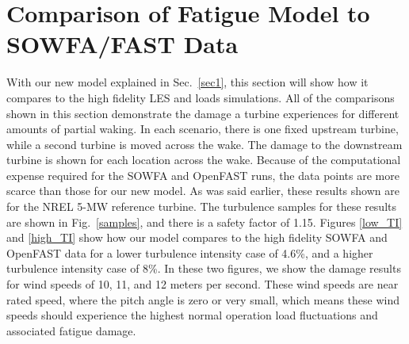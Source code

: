 \documentclass[11pt,letterpaper]{article}
\begin{document}
\section{Comparison of Fatigue Model to SOWFA/FAST Data}
With our new model explained in Sec.~\ref{sec1}, this section will show how it compares to the high fidelity LES and loads simulations. All of the comparisons shown in this section demonstrate the damage a turbine experiences for different amounts of partial waking. In each scenario, there is one fixed upstream turbine, while a second turbine is moved across the wake. The damage to the downstream turbine is shown for each location across the wake. Because of the computational expense required for the SOWFA and OpenFAST runs, the data points are more scarce than those for our new model. As was said earlier, these results shown are for the NREL 5-MW reference turbine. The turbulence samples for these results are shown in Fig.~\ref{samples}, and there is a safety factor of 1.15. Figures \ref{low_TI} and \ref{high_TI} show how our model compares to the high fidelity SOWFA and OpenFAST data for a lower turbulence intensity case of 4.6\%, and a higher turbulence intensity case of 8\%. In these two figures, we show the damage results for wind speeds of 10, 11, and 12 meters per second. These wind speeds are near rated speed, where the pitch angle is zero or very small, which means these wind speeds should experience the highest normal operation load fluctuations and associated fatigue damage.
\end{document}
